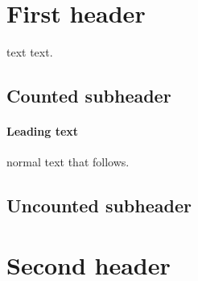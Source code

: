 \documentclass{article}
\begin{document}
    \tableofcontents
    \section{First header}
        text text.
        \subsection{Counted subheader}
            \paragraph{Leading text}
                normal text that follows.
        \subsection*{Uncounted subheader}
    \section{Second header}
\end{document}
